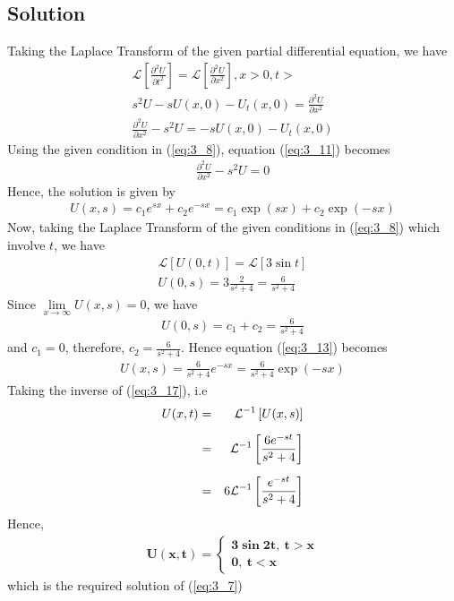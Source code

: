 \documentclass[11pt]{report}
\newcommand{\sps}{\\[0.2cm]}
\newcommand{\refn}[1]{(\ref{#1})}
\newcommand{\refx}[1]{\refn{eq:#1}}
\newcommand{\dsp}{\displaystyle}
\newcommand{\Laplace}{\mathcal{L}}
\newcommand{\sbracket}[1]{\left[#1\right]}
\newcommand{\LFn}[1]{\Laplace \sbracket{#1}}
\newcommand{\InverseL}[1]{\Laplace^{-1}\left[#1\right]}
\newcommand{\Lpt}{Laplace Transform }
\begin{document}
	\subsection*{Solution}
	Taking the \Lpt of the given partial differential equation, we have
	\begin{eqnarray}
		\LFn{\frac{\partial^2 U}{\partial t^2}} = \LFn{\frac{\partial^2 U}{\partial x^2}}, x > 0, t >\sps
		s^2U - sU(x,0) - U_t(x,0) = \frac{\partial^2 U}{\partial x^2}\sps
		\frac{\partial^2 U}{\partial x^2} - s^2U = -sU(x,0) - U_t(x,0)\label{eq:3_11}
	\end{eqnarray}
	Using the given condition in \refx{3_8}, equation \refx{3_11} becomes
	\begin{eqnarray}
		\frac{\partial^2 U}{\partial x^2} - s^2 U = 0 
	\end{eqnarray}
	Hence, the solution is given by
	\begin{eqnarray}
		U(x,s) = c_1e^{sx} + c_2e^{-sx} = c_1\exp(sx) + c_2\exp(-sx)\label{eq:3_13}
	\end{eqnarray}
	Now, taking the \Lpt of the given conditions in \refx{3_8} which involve $t$, we have
	\begin{eqnarray}
		\LFn{U(0,t)} = \LFn{3\sin t} \label{eq:3_14}\sps
		U(0,s) = 3\frac{2}{s^2 + 4} = \frac{6}{s^2 + 4}\label{eq:3_15}
	\end{eqnarray}
	Since $\lim\limits_{x\rightarrow \infty}U(x,s) = 0$, we have
	\begin{eqnarray}
		U(0,s) = c_1 + c_2 = \frac{6}{s^2 + 4}
	\end{eqnarray}
	and $c_1 = 0$, therefore, $\dsp c_2 = \frac{6}{s^2 + 4}$. Hence equation \refx{3_13} becomes
	\begin{eqnarray}
		U(x,s) = \frac{6}{s^2+4}e^{-sx} = \frac{6}{s^2+4}\exp(-sx)\label{eq:3_17}
	\end{eqnarray}
	Taking the inverse of \refx{3_17}, i.e
	\begin{eqnarray}
		U(x,t) &=& \InverseL{U(x,s)}\notag\sps
		&=& \InverseL{\frac{6e^{-st}}{s^2+4}}\notag\sps
		&=& 6\InverseL{\frac{e^{-st}}{s^2+4}}\notag 
	\end{eqnarray}
	Hence,
	\begin{eqnarray*}
		\mathbf{U(x,t) = \left\{
			\begin{array}{l}
			3\sin 2t,~ t >x\\
			0,~ t < x
			\end{array}
		\right.}
	\end{eqnarray*}
	which is the required solution of \refx{3_7}
	
\end{document}
